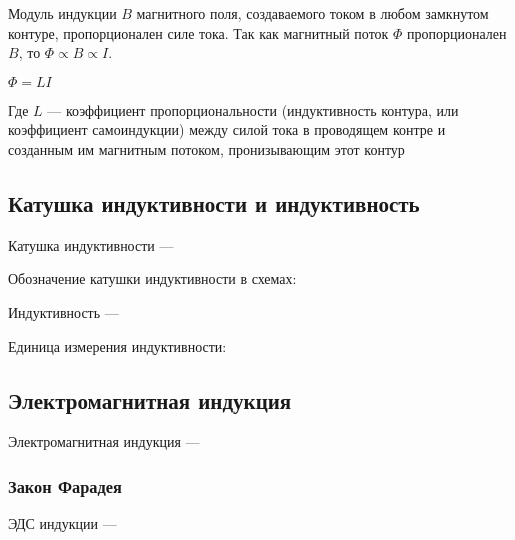 Модуль индукции $B$ магнитного поля, создаваемого током в любом замкнутом контуре, пропорционален силе тока. Так как магнитный поток $\Phi$ пропорционален $B$, то 
$\Phi \propto B \propto I$.
\begin{center}
$\Phi = LI$
\end{center}

Где $L$  — коэффициент пропорциональности (индуктивность контура, или коэффициент самоиндукции) между силой тока в проводящем контре и созданным им магнитным потоком, пронизывающим этот контур

\subsection{Катушка индуктивности и индуктивность}

Катушка индуктивности --- \hrulefill

\hrulefill

\hrulefill

Обозначение катушки индуктивности в схемах:


\newpage 

Индуктивность --- \hrulefill

\hrulefill

\hrulefill

Единица измерения индуктивности: 


\subsection{Электромагнитная индукция}

Электромагнитная индукция --- \hrulefill

\hrulefill

\hrulefill


\subsubsection{Закон Фарадея}

ЭДС индукции --- \hrulefill

